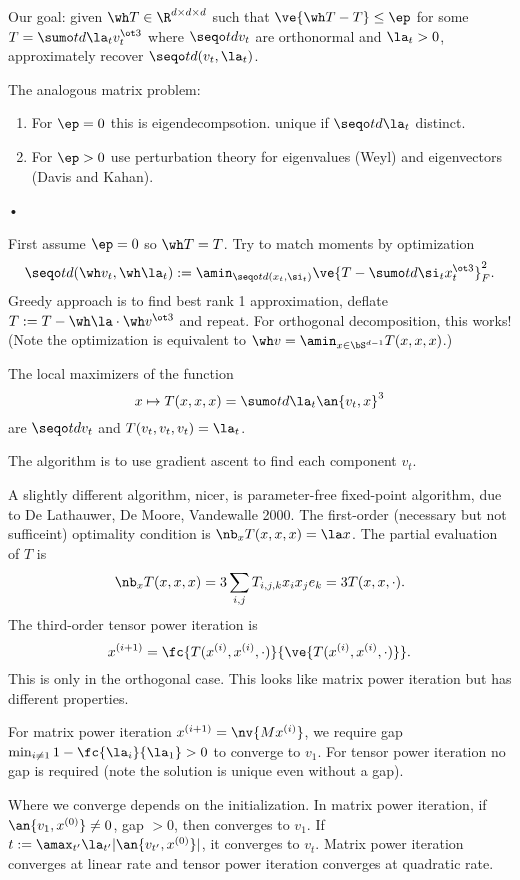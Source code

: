 Our goal: given $\wh T\in \R^{d\times d\times d}$ such that $\ve{\wh T- T}\le \ep$ for some $T=\sumo td \la_t v_t^{\ot 3}$ where $\seqo td{v_t}$ are orthonormal and $\la_t>0$, approximately recover $\seqo td{(v_t,\la_t)}$. 

The analogous matrix problem:
\begin{enumerate}
\item
For $\ep=0$ this is eigendecompsotion. %
unique if $\seqo td{\la_t}$ distinct. 
\item
For $\ep>0$ use perturbation theory for eigenvalues (Weyl) and eigenvectors (Davis and Kahan).
\end{enumerate}•

First assume $\ep=0$ so $\wh T=T$. Try to match moments by optimization
$$
\seqo td{(\wh v_t,\wh \la_t)} :=\amin_{\seqo td{(x_t,\si_t)}}\ve{T-\sumo td \si_t x_t^{\ot 3}}_F^2.
$$
Greedy approach is to find best rank 1 approximation, deflate $T:=T-\wh \la \cdot \wh v^{\ot 3}$ and repeat. For orthogonal decomposition, this works!
(Note the optimization is equivalent to $\wh v = \amin_{x\in \bS^{d-1}} T(x,x,x)$.)

\begin{clm}
The local maximizers of the function
$$
x\mapsto T(x,x,x) = \sumo td \la_t \an{v_t,x}^3
$$
 are $\seqo td{v_t}$ and $T(v_t,v_t,v_t)=\la_t$.
\end{clm}
The algorithm is to use gradient ascent to find each component $v_t$.

A slightly different algorithm, nicer, is parameter-free fixed-point algorithm, due to De Lathauwer, De Moore, Vandewalle 2000. The first-order (necessary but not sufficeint) optimality condition is $\nb_x T(x,x,x)=\la x$. The partial evaluation of $T$ is 
$$\nb_x T(x,x,x) = 3\sum_{i,j} T_{i,j,k}x_ix_je_k = 3T(x,x,\cdot).$$
The third-order tensor power iteration is
$$
x^{(i+1)} = \fc{T(x^{(i)}, x^{(i)}, \cdot)}{\ve{T(x^{(i)}, x^{(i)}, \cdot)}}.
$$
This is only in the orthogonal case.
This looks like matrix power iteration but has different properties.

For matrix power iteration $x^{(i+1)}=\nv{Mx^{(i)}}$, we require gap $\min_{i\ne 1} 1- \fc{\la_i}{\la_1}>0$ to converge to $v_1$. For tensor power iteration no gap is required (note the solution is unique even without a gap).

Where we converge depends on the initialization.  In matrix power iteration, if $\an{v_1,x^{(0)}}\ne 0$, gap $>0$, then converges to $v_1$.
If $t:=\amax_{t'} \la_{t'} |\an{v_{t'},x^{(0)}}|$, it converges to $v_t$. 
Matrix power iteration converges at linear rate and tensor power iteration converges at quadratic rate.

